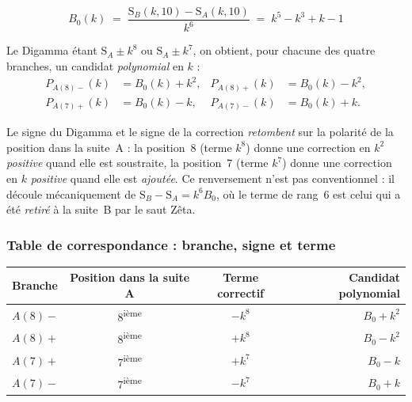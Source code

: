 \documentclass[11pt,a4paper]{article}
\newcommand{\SA}{\mathrm{S}_A}
\newcommand{\SB}{\mathrm{S}_B}
\begin{document}
\vspace{0.3cm}
\begin{boiteformule}
\[
  \boxed{\;B_0(k) \;=\; \frac{\SB(k,10)-\SA(k,10)}{k^{6}}
  \;=\; k^{5}-k^{3}+k-1\;}
\]
\end{boiteformule}

Le Digamma étant $\SA \pm k^{8}$ ou $\SA \pm k^{7}$, on obtient, pour
chacune des quatre branches, un candidat \emph{polynomial} en $k$ :
\begin{align*}
  P_{A(8)-}(k) &= B_0(k) + k^{2}, &
  P_{A(8)+}(k) &= B_0(k) - k^{2},\\
  P_{A(7)+}(k) &= B_0(k) - k, &
  P_{A(7)-}(k) &= B_0(k) + k.
\end{align*}

\vspace{0.3cm}
\begin{boitenote}
Le signe du Digamma et le signe de la correction \emph{retombent} sur la
polarité de la position dans la suite~A : la position~8 (terme
$k^{8}$) donne une correction en $k^{2}$ \emph{positive} quand elle est
soustraite, la position~7 (terme $k^{7}$) donne une correction en $k$
\emph{positive} quand elle est \emph{ajoutée}. Ce renversement n'est pas
conventionnel : il découle mécaniquement de
$\SB-\SA = k^{6}B_0$, où le terme de rang~6 est celui qui a été
\emph{retiré} à la suite~B par le saut Zêta.
\end{boitenote}


\subsubsection{Table de correspondance : branche, signe et terme}

\begin{center}
\small
\begin{tabular}{@{}l c c r@{}}
\toprule
\rowcolor{spectralgris}
Branche & Position dans la suite A & Terme correctif & Candidat polynomial \\
\midrule
$A(8)-$ & 8\textsuperscript{ième} & $-k^{8}$ & $B_0+k^{2}$ \\
$A(8)+$ & 8\textsuperscript{ième} & $+k^{8}$ & $B_0-k^{2}$ \\
$A(7)+$ & 7\textsuperscript{ième} & $+k^{7}$ & $B_0-k$ \\
$A(7)-$ & 7\textsuperscript{ième} & $-k^{7}$ & $B_0+k$ \\
\bottomrule
\end{tabular}
\end{center}
\end{document}
